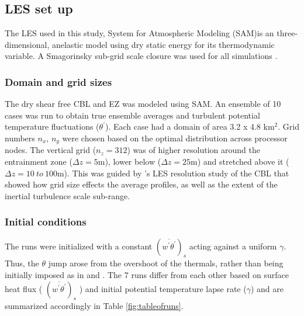 \documentclass[referee]{svjour3}
\begin{document}
\subsection{LES set up}

The LES used in this study, System for Atmospheric Modeling (SAM)is an three-dimensional, anelastic model using dry static energy for its thermodynamic variable.  A Smagorinsky sub-grid scale closure was used for all simulations \citep{KhairRand}.

\subsubsection{Domain and grid sizes}
The dry shear free CBL and EZ was modeled using SAM.  An ensemble of 10 cases was run to obtain true ensemble averages and turbulent potential temperature fluctuations ($\theta^{'}$). Each case had a domain of area 3.2 x 4.8 km$^{2}$.  Grid numbers $n_{x}$, $n_{y}$ were chosen based on the optimal distribution across processor nodes. The vertical grid ($n_{z}=312$) was of higher resolution around the entrainment zone ($\Delta z = 5$m), lower below ($\Delta z = 25$m) and stretched above it ($\Delta z = 10 \ to \ 100 $m). This was guided by \cite{SullPat}'s LES resolution study of the CBL that showed how grid size effects the average profiles, as well as the extent of the inertial turbulence scale sub-range.\\

\subsubsection{Initial conditions}

The runs were initialized with a constant $(\overline{w^{'}\theta^{'}})_{s}$ acting against a uniform $\gamma$.  Thus, the  $\theta$ jump arose from the overshoot of the thermals, rather than being initially imposed as in \cite{Sullivan98} and \cite{Brooks12}.  The 7 runs differ from each other based on surface heat flux ( $(\overline{w^{'}\theta^{'}})_{s}$ ) and initial potential temperature lapse rate ($\gamma$) and are summarized accordingly in Table \ref{fig:tableofruns}.
\end{document}
